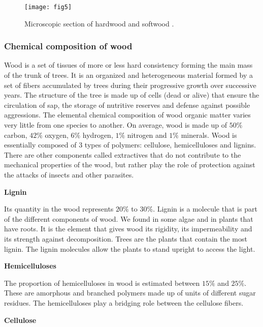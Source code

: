 \begin{figure}[htp]
	\centering
	\texttt{[image: fig5]}
	\caption{Microscopic section of hardwood and softwood \citep{Thibaut2015phd}.}
	\label{fig:fig5}
\end{figure}

\subsubsection{Chemical composition of wood}

Wood is a set of tissues of more or less hard consistency forming the main mass of the trunk of trees. It is an organized and heterogeneous material formed by a set of fibers accumulated by trees during their progressive growth over successive years. The structure of the tree is made up of cells (dead or alive) that ensure the circulation of sap, the storage of nutritive reserves and defense against possible aggressions.
The elemental chemical composition of wood organic matter varies very little from one species to another. On average, wood is made up of $50 \%$ carbon, $42 \%$ oxygen, $6 \%$ hydrogen, $1 \%$ nitrogen and $1 \%$ minerals. Wood is essentially composed of 3 types of polymers: cellulose, hemicelluloses and lignins. There are other components called extractives that do not contribute to the mechanical properties of the wood, but rather play the role of protection against the attacks of insects and other parasites.

\smallskip

\textbf{Lignin}

Its quantity in the wood represents $20 \%$ to $30 \%$. Lignin is a molecule that is part of the different components of wood. We found in some algae and in plants that have roots. It is the element that gives wood its rigidity, its impermeability and its strength against decomposition. Trees are the plants that contain the most lignin. The lignin molecules allow the plants to stand upright to access the light.

\smallskip

\textbf{Hemicelluloses}

The proportion of hemicelluloses in wood is estimated between $15 \%$ and $25 \%$. These are amorphous and branched polymers made up of units of different sugar residues. The hemicelluloses play a bridging role between the cellulose fibers.

\smallskip

\textbf{Cellulose}


